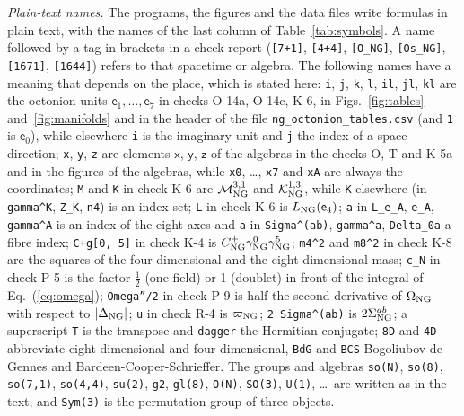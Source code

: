 \emph{Plain-text names.} The programs, the figures and the data files write formulas in plain text,
with the names of the last column of Table~\ref{tab:symbols}. A name followed by a tag in brackets in
a check report (\texttt{[7+1]}, \texttt{[4+4]}, \texttt{[O\_NG]}, \texttt{[Os\_NG]}, \texttt{[1671]},
\texttt{[1644]}) refers to that spacetime or algebra. The following names have a meaning that depends on
the place, which is stated here: \texttt{i}, \texttt{j}, \texttt{k}, \texttt{l}, \texttt{il},
\texttt{jl}, \texttt{kl} are the octonion units $\mathsf e_1,\dots,\mathsf e_7$ in checks O-14a, O-14c,
K-6, in Figs.~\ref{fig:tables} and~\ref{fig:manifolds} and in the header of the file
\texttt{ng\_octonion\_tables.csv} (and \texttt{1} is $\mathsf e_0$), while
elsewhere \texttt{i} is the imaginary unit and \texttt{j} the index of a space direction;
\texttt{x}, \texttt{y}, \texttt{z} are elements $\mathsf x$, $\mathsf y$, $\mathsf z$ of the algebras in
the checks O, T and K-5a and in the figures of the algebras, while \texttt{x0}, \dots, \texttt{x7} and
\texttt{xA} are always the coordinates; \texttt{M} and \texttt{K} in check K-6 are
$\mathcal M^{3,1}_{\rm NG}$ and $\mathcal K^{1,3}_{\rm NG}$, while \texttt{K} elsewhere (in
\texttt{gamma\^{}K}, \texttt{Z\_K}, \texttt{n4}) is an index set; \texttt{L} in check K-6 is
$L_{\rm NG}(\mathsf e_4)$; \texttt{a} in \texttt{L\_e\_A}, \texttt{e\_A}, \texttt{gamma\^{}A} is an index
of the eight axes and \texttt{a} in \texttt{Sigma\^{}(ab)}, \texttt{gamma\^{}a}, \texttt{Delta\_0a} a
fibre index; \texttt{C+g[0, 5]} in check K-4 is $C^+_{\rm NG}\gamma^0_{\rm NG}\gamma^5_{\rm NG}$;
\texttt{m4\^{}2} and \texttt{m8\^{}2} in check K-8 are the squares of the four-dimensional and the
eight-dimensional mass; \texttt{c\_N} in check P-5 is the factor $\tfrac12$ (one field) or 1 (doublet)
in front of the integral of Eq.~(\ref{eq:omega}); \texttt{Omega''/2} in check P-9 is half the second
derivative of $\Omega_{\rm NG}$ with respect to $\lvert\Delta_{\rm NG}\rvert$; \texttt{u} in check R-4 is
$\varpi_{\rm NG}$; \texttt{2 Sigma\^{}(ab)} is $2\Sigma^{ab}_{\rm NG}$; a superscript \texttt{T} is the
transpose and \texttt{dagger} the Hermitian conjugate; \texttt{8D} and \texttt{4D} abbreviate
eight-dimensional and four-dimensional, \texttt{BdG} and \texttt{BCS} Bogoliubov-de Gennes and
Bardeen-Cooper-Schrieffer. The groups and algebras \texttt{so(N)}, \texttt{so(8)},
\texttt{so(7,1)}, \texttt{so(4,4)}, \texttt{su(2)}, \texttt{g2}, \texttt{gl(8)}, \texttt{O(N)},
\texttt{SO(3)}, \texttt{U(1)}, \dots\ are written as in the text, and \texttt{Sym(3)} is the
permutation group of three objects.

